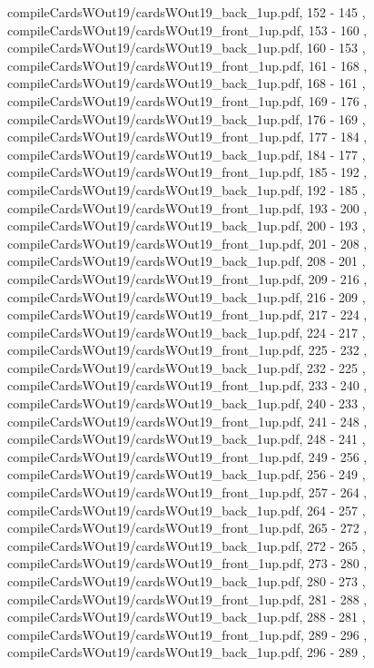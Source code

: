 \documentclass[letterpaper]{article}
\begin{document}
{									compileCardsWOut19/cardsWOut19_back_1up.pdf,			152		-		145		,
									compileCardsWOut19/cardsWOut19_front_1up.pdf,		153		-		160		,
									compileCardsWOut19/cardsWOut19_back_1up.pdf,			160		-		153		,
									compileCardsWOut19/cardsWOut19_front_1up.pdf,		161		-		168		,
									compileCardsWOut19/cardsWOut19_back_1up.pdf,			168		-		161		,
									compileCardsWOut19/cardsWOut19_front_1up.pdf,		169		-		176		,
									compileCardsWOut19/cardsWOut19_back_1up.pdf,			176		-		169		,
									compileCardsWOut19/cardsWOut19_front_1up.pdf,		177		-		184		,
									compileCardsWOut19/cardsWOut19_back_1up.pdf,			184		-		177		,
									compileCardsWOut19/cardsWOut19_front_1up.pdf,		185		-		192		,
									compileCardsWOut19/cardsWOut19_back_1up.pdf,			192		-		185		,
									compileCardsWOut19/cardsWOut19_front_1up.pdf,		193		-		200		,
									compileCardsWOut19/cardsWOut19_back_1up.pdf,			200		-		193		,
									compileCardsWOut19/cardsWOut19_front_1up.pdf,		201		-		208		,
									compileCardsWOut19/cardsWOut19_back_1up.pdf,			208		-		201		,
									compileCardsWOut19/cardsWOut19_front_1up.pdf,		209		-		216		,
									compileCardsWOut19/cardsWOut19_back_1up.pdf,			216		-		209		,
									compileCardsWOut19/cardsWOut19_front_1up.pdf,		217		-		224		,
									compileCardsWOut19/cardsWOut19_back_1up.pdf,			224		-		217		,
									compileCardsWOut19/cardsWOut19_front_1up.pdf,		225		-		232		,
									compileCardsWOut19/cardsWOut19_back_1up.pdf,			232		-		225		,
									compileCardsWOut19/cardsWOut19_front_1up.pdf,		233		-		240		,
									compileCardsWOut19/cardsWOut19_back_1up.pdf,			240		-		233		,
									compileCardsWOut19/cardsWOut19_front_1up.pdf,		241		-		248		,
									compileCardsWOut19/cardsWOut19_back_1up.pdf,			248		-		241		,
									compileCardsWOut19/cardsWOut19_front_1up.pdf,		249		-		256		,
									compileCardsWOut19/cardsWOut19_back_1up.pdf,			256		-		249		,
									compileCardsWOut19/cardsWOut19_front_1up.pdf,		257		-		264		,
									compileCardsWOut19/cardsWOut19_back_1up.pdf,			264		-		257		,
									compileCardsWOut19/cardsWOut19_front_1up.pdf,		265		-		272		,
									compileCardsWOut19/cardsWOut19_back_1up.pdf,			272		-		265		,
									compileCardsWOut19/cardsWOut19_front_1up.pdf,		273		-		280		,
									compileCardsWOut19/cardsWOut19_back_1up.pdf,			280		-		273		,
									compileCardsWOut19/cardsWOut19_front_1up.pdf,		281		-		288		,
									compileCardsWOut19/cardsWOut19_back_1up.pdf,			288		-		281		,
									compileCardsWOut19/cardsWOut19_front_1up.pdf,		289		-		296		,
									compileCardsWOut19/cardsWOut19_back_1up.pdf,			296		-		289		,
}
\end{document}
